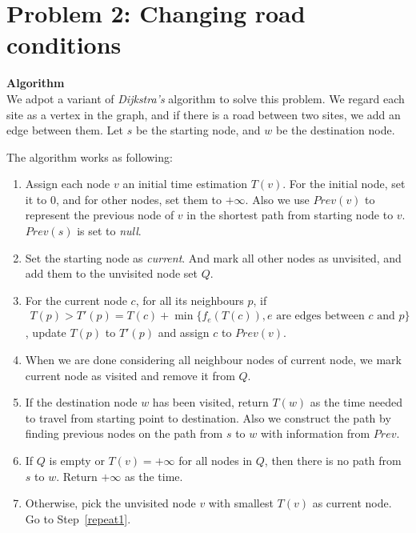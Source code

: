 \documentclass{article}
\newcommand{\Algorithm}{\textbf{Algorithm} \\}
\begin{document}
\section*{Problem 2: Changing road conditions}
\Algorithm
We adpot a variant of \textit{Dijkstra's} algorithm to solve this problem. We regard each site as
a vertex in the graph, and if there is a road between two sites, we add an edge between them.
Let $s$ be the starting node, and $w$ be the destination node.

The algorithm works as following:
\begin{enumerate}
  \item Assign each node $v$ an initial time estimation $T(v)$. For the initial node, set it to $0$,
    and for other nodes, set them to $+\infty$. Also we use $Prev(v)$ to represent the previous node 
    of $v$ in the shortest path from starting node to $v$. $Prev(s)$ is set to \textit{null}.

  \item Set the starting node as \textit{current}. And mark all other nodes as unvisited, and add 
    them to the unvisited node set $Q$. 

  \item \label{repeat1}
    For the current node $c$, for all its neighbours $p$, if 
    \begin{align}
      T(p) > T'(p) = T(c) + \min\{f_e(T(c)), e \text{ are edges between } c \text{ and } p\}
    \end{align}
     , update $T(p)$ to $T'(p)$ and assign $c$ to $Prev(v)$.

    \item When we are done considering all neighbour nodes of current node, we mark current node as visited and remove it from $Q$.

    \item If the destination node $w$ has been visited, return $T(w)$ as the time needed to 
      travel from starting point to destination. Also we construct the path by finding previous
      nodes on the path from $s$ to $w$ with information from $Prev$. 
    \item If $Q$ is empty or $T(v) = +\infty$ for all nodes in $Q$, then there is no path from $s$
      to $w$. Return $+\infty$ as the time.      

    \item Otherwise, pick the unvisited node $v$ with smallest $T(v)$ as current node. Go to Step~\ref{repeat1}.
\end{enumerate}
\end{document}
